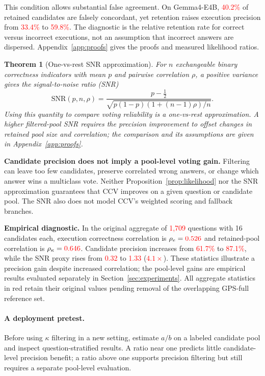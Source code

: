 \documentclass{article}
\newcommand{\ccv}{\textsc{CCV}}
\newcommand{\recheck}[1]{\textcolor{red}{#1}}
\newtheorem{theorem}{Theorem}
\begin{document}
This condition allows substantial false agreement. On Gemma4-E4B, \recheck{40.2\%} of retained candidates are falsely concordant, yet retention raises execution precision from \recheck{33.4\%} to \recheck{59.8\%}. The diagnostic is the relative retention rate for correct versus incorrect executions, not an assumption that incorrect answers are dispersed. Appendix~\ref{app:proofs} gives the proofs and measured likelihood ratios.

\begin{theorem}[One-vs-rest SNR approximation]
\label{thm:snr}
For $n$ exchangeable binary correctness indicators with mean $p$ and pairwise correlation $\rho$, a positive variance gives the signal-to-noise ratio (SNR)
\begin{equation}
    \mathrm{SNR}(p,n,\rho)=\frac{p-\tfrac{1}{2}}{\sqrt{p(1-p)(1+(n-1)\rho)/n}}.
\end{equation}
Using this quantity to compare voting reliability is a one-vs-rest approximation. A higher filtered-pool SNR requires the precision improvement to offset changes in retained pool size and correlation; the comparison and its assumptions are given in Appendix~\ref{app:proofs}.
\end{theorem}

\textbf{Candidate precision does not imply a pool-level voting gain.} Filtering can leave too few candidates, preserve correlated wrong answers, or change which answer wins a multiclass vote. Neither Proposition~\ref{prop:likelihood} nor the SNR approximation guarantees that \ccv{} improves on a given question or candidate pool. The SNR also does not model \ccv{}'s weighted scoring and fallback branches.

\textbf{Empirical diagnostic.} In the original aggregate of \recheck{1,709} questions with 16 candidates each, execution correctness correlation is $\rho_e=\recheck{0.526}$ and retained-pool correlation is $\rho_\kappa=\recheck{0.646}$. Candidate precision increases from \recheck{61.7\%} to \recheck{87.1\%}, while the SNR proxy rises from \recheck{0.32} to \recheck{1.33} (\recheck{$4.1\times$}). These statistics illustrate a precision gain despite increased correlation; the pool-level gains are empirical results evaluated separately in Section~\ref{sec:experiments}. All aggregate statistics in red retain their original values pending removal of the overlapping GPS-full reference set.

\paragraph{A deployment pretest.}
Before using $\kappa$ filtering in a new setting, estimate $a/b$ on a labeled candidate pool and inspect question-stratified results. A ratio near one predicts little candidate-level precision benefit; a ratio above one supports precision filtering but still requires a separate pool-level evaluation.
\end{document}
